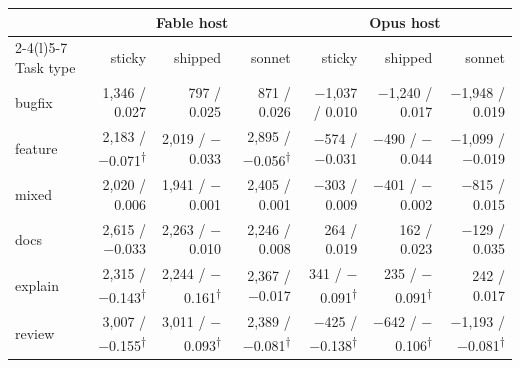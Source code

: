 \begin{tabular*}{\textwidth}{@{\extracolsep{\fill}}l r r r r r r@{}}
\toprule
 & \multicolumn{3}{c}{Fable host} & \multicolumn{3}{c}{Opus host} \\
\cmidrule(lr){2-4}\cmidrule(l){5-7}
Task type & sticky & shipped & sonnet & sticky & shipped & sonnet \\
\midrule
bugfix & 1{,}346 / 0.027 & 797 / 0.025 & 871 / 0.026 & $-$1{,}037 / 0.010 & $-$1{,}240 / 0.017 & $-$1{,}948 / 0.019 \\
feature & 2{,}183 / $-$0.071\textsuperscript{$\dagger$} & 2{,}019 / $-$0.033 & 2{,}895 / $-$0.056\textsuperscript{$\dagger$} & $-$574 / $-$0.031 & $-$490 / $-$0.044 & $-$1{,}099 / $-$0.019 \\
mixed & 2{,}020 / 0.006 & 1{,}941 / $-$0.001 & 2{,}405 / 0.001 & $-$303 / 0.009 & $-$401 / $-$0.002 & $-$815 / 0.015 \\
docs & 2{,}615 / $-$0.033 & 2{,}263 / $-$0.010 & 2{,}246 / 0.008 & 264 / 0.019 & 162 / 0.023 & $-$129 / 0.035 \\
explain & 2{,}315 / $-$0.143\textsuperscript{$\dagger$} & 2{,}244 / $-$0.161\textsuperscript{$\dagger$} & 2{,}367 / $-$0.017 & 341 / $-$0.091\textsuperscript{$\dagger$} & 235 / $-$0.091\textsuperscript{$\dagger$} & 242 / 0.017 \\
review & 3{,}007 / $-$0.155\textsuperscript{$\dagger$} & 3{,}011 / $-$0.093\textsuperscript{$\dagger$} & 2{,}389 / $-$0.081\textsuperscript{$\dagger$} & $-$425 / $-$0.138\textsuperscript{$\dagger$} & $-$642 / $-$0.106\textsuperscript{$\dagger$} & $-$1{,}193 / $-$0.081\textsuperscript{$\dagger$} \\
\bottomrule
\end{tabular*}

